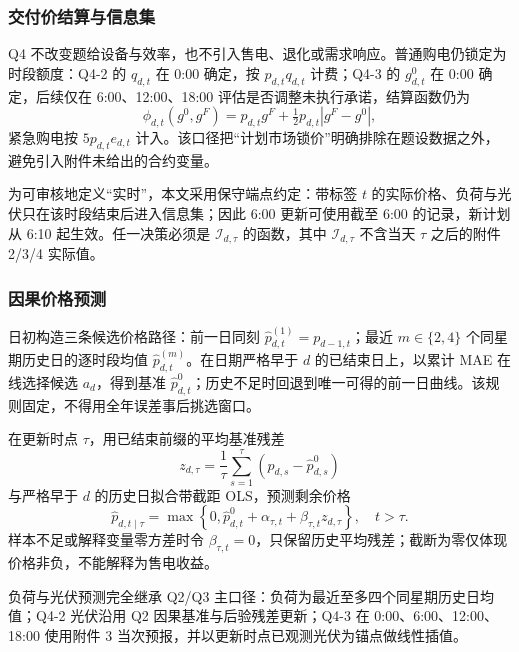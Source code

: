 \subsubsection{交付价结算与信息集}

Q4 不改变题给设备与效率，也不引入售电、退化或需求响应。普通购电仍锁定为时段额度：Q4-2 的 $q_{d,t}$ 在 0:00 确定，按 $p_{d,t}q_{d,t}$ 计费；Q4-3 的 $g^0_{d,t}$ 在 0:00 确定，后续仅在 6:00、12:00、18:00 评估是否调整未执行承诺，结算函数仍为
\begin{equation}
\phi_{d,t}(g^0,g^F)=p_{d,t}g^F+\tfrac12 p_{d,t}|g^F-g^0|,
\label{eq:q4-settlement}
\end{equation}
紧急购电按 $5p_{d,t}e_{d,t}$ 计入。该口径把“计划市场锁价”明确排除在题设数据之外，避免引入附件未给出的合约变量。

为可审核地定义“实时”，本文采用保守端点约定：带标签 $t$ 的实际价格、负荷与光伏只在该时段结束后进入信息集；因此 6:00 更新可使用截至 6:00 的记录，新计划从 6:10 起生效。任一决策必须是 $\mathcal I_{d,\tau}$ 的函数，其中 $\mathcal I_{d,\tau}$ 不含当天 $\tau$ 之后的附件 2/3/4 实际值。

\subsubsection{因果价格预测}

日初构造三条候选价格路径：前一日同刻 $\widehat p^{(1)}_{d,t}=p_{d-1,t}$；最近 $m\in\{2,4\}$ 个同星期历史日的逐时段均值 $\widehat p^{(m)}_{d,t}$。在日期严格早于 $d$ 的已结束日上，以累计 MAE 在线选择候选 $a_d$，得到基准 $\widehat p^0_{d,t}$；历史不足时回退到唯一可得的前一日曲线。该规则固定，不得用全年误差事后挑选窗口\cite{tashman}。

在更新时点 $\tau$，用已结束前缀的平均基准残差
\begin{equation}
z_{d,\tau}=\frac1{\tau}\sum_{s=1}^{\tau}\left(p_{d,s}-\widehat p^0_{d,s}\right)
\label{eq:q4-price-prefix}
\end{equation}
与严格早于 $d$ 的历史日拟合带截距 OLS，预测剩余价格
\begin{equation}
\widehat p_{d,t\mid\tau}
=\max\left\{0,\widehat p^0_{d,t}+\alpha_{\tau,t}+\beta_{\tau,t}z_{d,\tau}\right\},\quad t>\tau.
\label{eq:q4-price-ols}
\end{equation}
样本不足或解释变量零方差时令 $\beta_{\tau,t}=0$，只保留历史平均残差；截断为零仅体现价格非负，不能解释为售电收益。

负荷与光伏预测完全继承 Q2/Q3 主口径：负荷为最近至多四个同星期历史日均值；Q4-2 光伏沿用 Q2 因果基准与后验残差更新；Q4-3 在 0:00、6:00、12:00、18:00 使用附件 3 当次预报，并以更新时点已观测光伏为锚点做线性插值。

